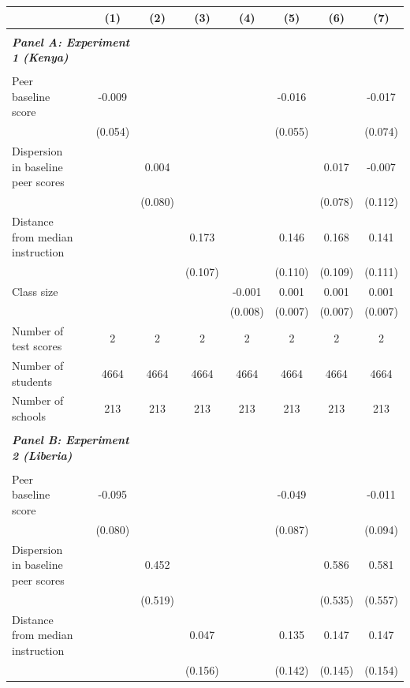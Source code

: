 \begin{center} 
\caption{\small Effect on test scores} 
\label{tab:descriptives} 
\begin{scriptsize}
\begin{threeparttable}
\begin{tabular} {@{} l l c c c c c c c  @{}} \toprule \toprule
& &(1)&(2)&(3)&(4)&(5)&(6)&(7) \\ \midrule 
\\
\multicolumn{3}{l}{\textbf{\textit{Panel A: Experiment 1 (Kenya)}}} \\
\\
Peer baseline score &  & -0.009 &  &  &  & -0.016 &  & -0.017 \\
                 &  & (0.054) &  &  &  & (0.055) &  & (0.074) \\
Dispersion in baseline peer scores &  &  & 0.004 &  &  &  & 0.017 & -0.007 \\
                 &  &  & (0.080) &  &  &  & (0.078) & (0.112) \\
Distance from median instruction &  &  &  & 0.173 &  & 0.146 & 0.168 & 0.141 \\
                 &  &  &  & (0.107) &  & (0.110) & (0.109) & (0.111) \\
Class size &  &  &  &  & -0.001 & 0.001 & 0.001 & 0.001 \\
                 &  &  &  &  & (0.008) & (0.007) & (0.007) & (0.007) \\
\midrule
Number of test scores &  & 2 & 2 & 2 & 2 & 2 & 2 & 2 \\
Number of students &  & 4664 & 4664 & 4664 & 4664 & 4664 & 4664 & 4664 \\
Number of schools &  & 213 & 213 & 213 & 213 & 213 & 213 & 213 \\
 \midrule
\\
\multicolumn{3}{l}{\textbf{\textit{Panel B: Experiment 2 (Liberia)}}} \\
\\
Peer baseline score &  & -0.095 &  &  &  & -0.049 &  & -0.011 \\
                 &  & (0.080) &  &  &  & (0.087) &  & (0.094) \\
Dispersion in baseline peer scores &  &  & 0.452 &  &  &  & 0.586 & 0.581 \\
                 &  &  & (0.519) &  &  &  & (0.535) & (0.557) \\
Distance from median instruction &  &  &  & 0.047 &  & 0.135 & 0.147 & 0.147 \\
                 &  &  &  & (0.156) &  & (0.142) & (0.145) & (0.154) \\

\end{tabular}
\end{threeparttable}
\end{scriptsize}
\end{center}

